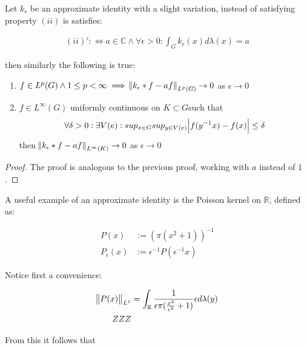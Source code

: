 \begin{theorem}
Let $k_\epsilon$ be an approximate identity with a slight variation, instead of satisfying property $(ii)$ is satisfies:

\begin{align*}
(ii)' :\Leftrightarrow a\in \mathbb{C} \wedge \forall \epsilon > 0 : \int_G k_\epsilon(x) d\lambda(x) = a 
\end{align*}

then similarly the following is true:

\begin{enumerate}
\item $f \in L^p(G) \wedge 1 \leq p < \infty \implies \norm{k_\epsilon \ast f - af}_{L^p(G)} \to 0 $ as $ \epsilon \to 0$
\item $f \in L^\infty(G)$ uniformly continuous on $K \subset G $such that 
\begin{align*}
\forall \delta>0: \exists V(e): sup_{x\in G}sup_{y \in V(e)}\abs{f(y^{-1}x)-f(x)}\leq \delta
\end{align*}
 then $ \norm{k_\epsilon \ast f - af}_{L^\infty(K)} \to 0$ as $\epsilon \to 0$  
\end{enumerate}

\end{theorem}

\begin{proof}
The proof is analogous to the previous proof, working with $a$ instead of $1$.\end{proof}


\begin{example}

A useful example of an approximate identity is the Poisson kernel on $\mathbb{R}$, defined as:

\begin{align*}
P(x) &:= (\pi(x^2+1))^{-1} \\
P_\epsilon(x) &:= \epsilon^{-1}P(\epsilon^{-1}x)
\end{align*}

Notice first a convenience:

\begin{align*}
\norm{P(x)}_{L^1} &= \int_\mathbb{R} \frac{1}{\epsilon \pi (\frac{x^2}{\epsilon^2}+1)} \epsilon d\lambda(y) \\
ZZZ
\end{align*}

From this it follows that 

\end{example}

